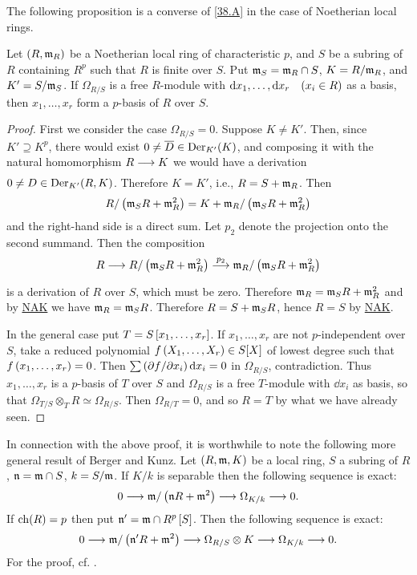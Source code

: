 \documentclass[../main]{subfiles}
\begin{document}
The following proposition is a converse of \ref{38.A} in the case of Noetherian local rings.
\begin{proposition}
\label{prop:38.01}
    Let $(R,\mathfrak{m}_R)$ be a Noetherian local ring of characteristic $p$, and $S$ be a subring of $R$ containing $R^p$ such that $R$ is finite over $S$. Put $\mathfrak{m}_S = \mathfrak{m}_R\cap S$, $K = R/\mathfrak{m}_R$, and $K' = S/\mathfrak{m}_S$. If $\Omega_{R/S}$ is a free $R$-module with $\dd{x_1}, \dots, \dd{x_r}\for{x_i \in R}$ as a basis, then $x_1, \dots, x_r$ form a $p$-basis of $R$ over $S$. 
\end{proposition}
\begin{proof}
    First we consider the case $\Omega_{R/S} = 0$. Suppose \newline $K \neq K'$. Then, since $K' \supseteq K^p$, there would exist $0 \neq \overline{D}\in \operatorname{Der}_{K'}(K)$, and composing it with the natural homomorphism $R \varrightarrow{} K$ we would have a derivation $0 \neq D \in \operatorname{Der}_{K'}(R,K)$. Therefore $K = K'$, i.e., $R = S+\mathfrak{m}_R$. Then \[R/\left(\mathfrak{m}_S R + \mathfrak{m}_R^2\right)=K+ \mathfrak{m}_R/\left(\mathfrak{m}_S R + \mathfrak{m}_R^2\right)\] and the right-hand side is a direct sum. Let $p_2$ denote the projection onto the second summand. Then the composition \[R\varrightarrow{} R/\br{\ideal{m}_S R + \ideal{m}^2_R} \varrightarrow[]{p_2} \ideal{m}_R/\br{\ideal{m}_S R + \ideal{m}^2_R}\] is a derivation of $R$ over $S$, which must be zero. Therefore $\mathfrak{m}_R=\mathfrak{m}_S R + \mathfrak{m}_R^2$ and by \hyperref[NAK]{NAK} we have $\mathfrak{m}_R = \mathfrak{m}_S R$. Therefore $R=S + \mathfrak{m}_S R$, hence $R=S$ by \hyperref[NAK]{NAK}. 

    In the general case put $T=S\left[x_1, \dots, x_r\right]$. If $x_1, \dots, x_r$ are not $p$-independent over $S$, take a reduced polynomial $f\left(X_1, \dots, X_r\right)\in S[X]$ of lowest degree such that $f\left(x_1, \dots, x_r\right)=0$. Then $\sum \left(\partial{f}/\partial{x_i}\right)\mathrm{d}x_i=0$ in $\Omega_{R/S}$, contradiction. Thus $x_1, \dots, x_r$ is a $p$-basis of $T$ over $S$ and $\Omega_{R/S}$ is a free $T$-module with $\dd{x_i}$ as basis, so that $\Omega_{T/S}\otimes_T R \simeq \Omega_{R/S}$. Then $\Omega_{R/T}=0$, and so $R = T$ by what we have already seen. 
\end{proof}

\begin{remark*}
    In connection with the above proof, it is worthwhile to note the following more general result of Berger and Kunz. Let $(R, \mathfrak{m}, K)$ be a local ring, $S$ a subring of $R$, $\mathfrak{n}=\mathfrak{m}\cap S$, $k = S/\mathfrak{m}$. If $K/k$ is separable then the following sequence is exact: \[0\longrightarrow \mathfrak{m}/\left(\mathfrak{n}R+\mathfrak{m}^2\right)\longrightarrow \Omega_{K/k}\longrightarrow 0.\] If $\operatorname{ch}(R) = p$ then put $\mathfrak{n}' = \mathfrak{m}\cap R^p\left[S\right]$. Then the following sequence is exact: \[0\longrightarrow \mathfrak{m}/\left(\mathfrak{n}' R + \mathfrak{m}^2\right)\longrightarrow \Omega_{R/S}\otimes K\longrightarrow \Omega_{K/k}\longrightarrow 0.\] For the proof, cf. \cite{bergerkunz1961}.
\end{remark*}
\end{document}
